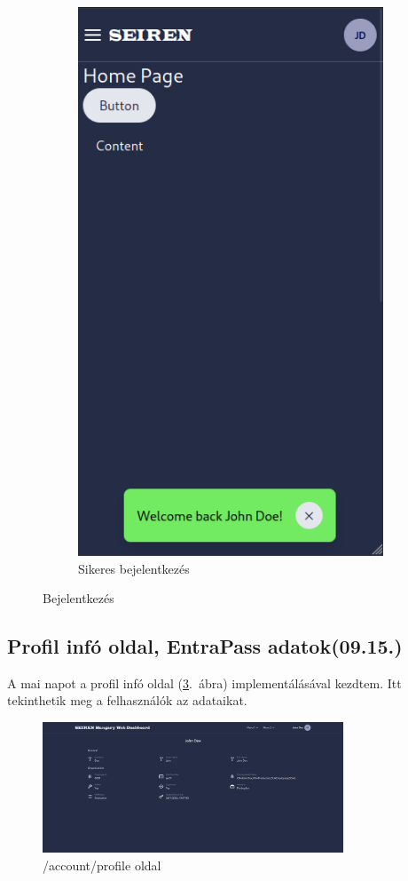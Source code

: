 \documentclass[a4paper]{article}
\begin{document}
\begin{figure}[ht]
\begin{subfigure}[b]{0.45\textwidth}
        \includegraphics[height=0.4\textheight]{images/login_successful.png}
        \caption{Sikeres bejelentkezés}
        \label{fig:login_successful}
    \end{subfigure}
    \caption{Bejelentkezés}
    \label{fig:login}
\end{figure}

\subsection{Profil infó oldal, EntraPass adatok(09.15.)}

A mai napot a profil infó oldal (\ref{fig:profile_info}.~ábra) implementálásával kezdtem. Itt tekinthetik meg a
felhasználók az adataikat.

\begin{figure}[ht]
  \centering
  \includegraphics[width = 0.8\textwidth]{images/profile_info.png}
  \caption{/account/profile oldal}
  \label{fig:profile_info}
\end{figure}
\end{document}
